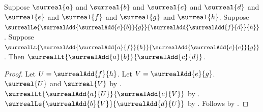 \begin{lemma}\label{surreal_add_le_lt_balance}
    Suppose $\surreal{a}$ and $\surreal{b}$ and $\surreal{c}$ and
        $\surreal{d}$ and $\surreal{e}$ and $\surreal{f}$ and
        $\surreal{g}$ and $\surreal{h}$.
    Suppose
        $\surrealLe{\surrealAdd{\surrealAdd{e}{b}}{g}}
            {\surrealAdd{\surrealAdd{f}{d}}{h}}$.
    Suppose
        $\surrealLt{\surrealAdd{\surrealAdd{a}{f}}{h}}
            {\surrealAdd{\surrealAdd{c}{e}}{g}}$.
    Then $\surrealLt{\surrealAdd{a}{b}}{\surrealAdd{c}{d}}$.
\end{lemma}
\begin{proof}
    Let $U=\surrealAdd{f}{h}$.
    Let $V=\surrealAdd{e}{g}$.
    $\surreal{U}$ and $\surreal{V}$
        by .
    $\surrealLt{\surrealAdd{a}{U}}{\surrealAdd{c}{V}}$
        by
        .
    $\surrealLe{\surrealAdd{b}{V}}{\surrealAdd{d}{U}}$
        by
        .
    Follows by .
\end{proof}

